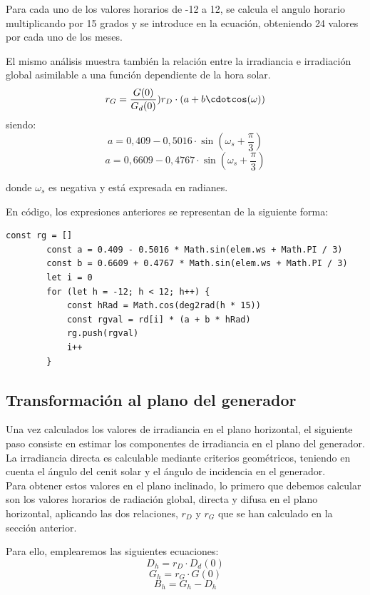 Para cada uno de los valores horarios de -12 a 12, se calcula el angulo horario multiplicando por 15 grados y se introduce en la ecuación, obteniendo 24 valores por cada uno de los meses.

El mismo análisis muestra también la relación entre la irradiancia e irradiación global asimilable a una función dependiente de la hora solar.
\begin{equation}
r_G = \frac{G(0)}{G_d(0)} ) r_D\cdot(a+b\cdotcos(\omega))
\end{equation}
siendo:
\begin{equation}
a=0,409 - 0,5016\cdot\sin(\omega_s+\frac{\pi}{3})
\end{equation}
\begin{equation}
a=0,6609 - 0,4767\cdot\sin(\omega_s+\frac{\pi}{3})
\end{equation}

donde $\omega_s$ es negativa y está expresada en radianes.

En código, los expresiones anteriores se representan de la siguiente forma:
\begin{lstlisting}[style=ES6, caption={Cálculo de rG}]
		const rg = []
		const a = 0.409 - 0.5016 * Math.sin(elem.ws + Math.PI / 3)
		const b = 0.6609 + 0.4767 * Math.sin(elem.ws + Math.PI / 3)
		let i = 0
		for (let h = -12; h < 12; h++) {
			const hRad = Math.cos(deg2rad(h * 15))
			const rgval = rd[i] * (a + b * hRad)
			rg.push(rgval)
			i++
		}
\end{lstlisting}

\subsection{Transformación al plano del generador}
\label{section:3.5.2}

Una vez calculados los valores de irradiancia en el plano horizontal, el siguiente paso consiste en estimar los componentes de irradiancia en el plano del generador. La irradiancia directa es calculable mediante criterios geométricos, teniendo en cuenta el ángulo del cenit solar y el ángulo de incidencia en el generador.\\

Para obtener estos valores en el plano inclinado, lo primero que debemos calcular son los valores horarios de radiación global, directa y difusa en el plano horizontal, aplicando las dos relaciones, $r_D$ y $r_G$ que se han calculado en la sección anterior.

Para ello, emplearemos las siguientes ecuaciones:
\begin{equation}
D_h = r_D \cdot D_d(0)
\end{equation}
\begin{equation}
G_h = r_G \cdot G(0)
\end{equation}
\begin{equation}
B_h = G_h - D_h
\end{equation}

